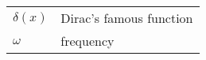 
\begin{tabular}{ll}
    \hline
    $\delta(x)$   & Dirac's famous function \\
    $\omega$      & frequency \\
    \hline
\end{tabular}
